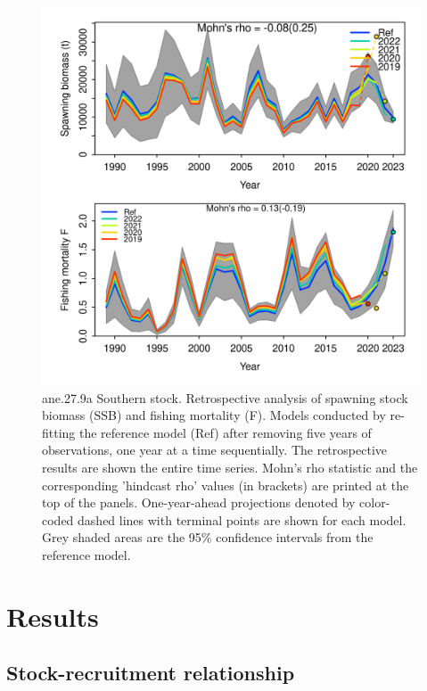 \documentclass[
]{article}
\begin{document}
\begin{figure}[H]

{\centering \includegraphics[width=0.95\linewidth]{report/retro/S1.0_4FLEETS_SelECO_RecIndex_Mnewfix/Retro} 

}

\caption{ane.27.9a Southern stock. Retrospective analysis of spawning stock biomass (SSB) and fishing mortality (F). Models  conducted by re-fitting the reference model (Ref) after removing five years of observations, one year at a time sequentially. The retrospective results are shown the entire time series. Mohn's rho statistic and the corresponding 'hindcast rho' values (in brackets) are printed at the top of the panels. One-year-ahead projections denoted by color-coded dashed lines with terminal points are shown for each model. Grey shaded areas are the 95\% confidence intervals from the reference model.}\label{fig:unnamed-chunk-29}
\end{figure}

\hypertarget{results}{%
\section{Results}\label{results}}

\hypertarget{stock-recruitment-relationship}{%
\subsection{Stock-recruitment
relationship}\label{stock-recruitment-relationship}}
\end{document}
